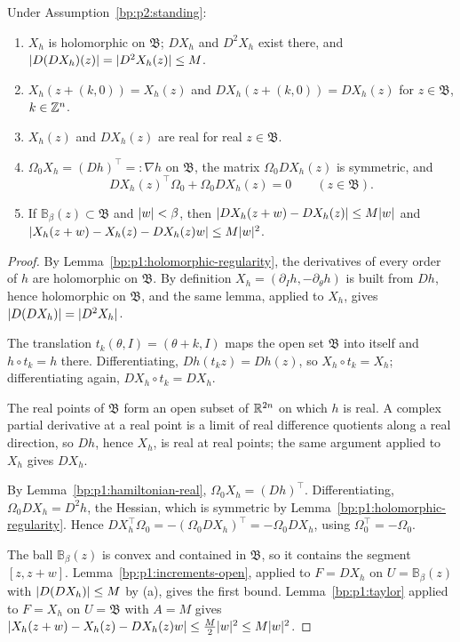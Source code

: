 \begin{lemma}\label{bp:p2:hamiltonian}
Under Assumption~\ref{bp:p2:standing}:
\begin{enumerate}[label=(\alph*)]
\item $X_h$ is holomorphic on $\mathfrak B$; $DX_h$ and $D^2X_h$ exist there, and
  $\lvert D(DX_h)(z)\rvert=\lvert D^2X_h(z)\rvert\le M$.
\item $X_h(z+(k,0))=X_h(z)$ and $DX_h(z+(k,0))=DX_h(z)$ for $z\in\mathfrak B$, $k\in\mathbb{Z}^n$.
\item $X_h(z)$ and $DX_h(z)$ are real for real $z\in\mathfrak B$.
\item $\Omega_0X_h=(Dh)^\top=:\nabla h$ on $\mathfrak B$, the matrix $\Omega_0DX_h(z)$ is symmetric, and
  \[
  DX_h(z)^\top\Omega_0+\Omega_0DX_h(z)=0\qquad(z\in\mathfrak B).
  \]
\item If $\mathbb B_\beta(z)\subset\mathfrak B$ and $\lvert w\rvert<\beta$, then
  $\lvert DX_h(z+w)-DX_h(z)\rvert\le M\lvert w\rvert$ and $\lvert X_h(z+w)-X_h(z)-DX_h(z)w\rvert\le M\lvert w\rvert^2$.
\end{enumerate}
\end{lemma}

\begin{proof}
\label{step:p2:ham-regular}
By Lemma~\ref{bp:p1:holomorphic-regularity}, the derivatives of every order of $h$ are holomorphic on
$\mathfrak B$. By definition $X_h=(\partial_Ih,-\partial_\theta h)$ is built from $Dh$, hence holomorphic on
$\mathfrak B$, and the same lemma, applied to $X_h$, gives $\lvert D(DX_h)\rvert=\lvert D^2X_h\rvert$.

\label{step:p2:ham-periodic}
The translation $t_k(\theta,I)=(\theta+k,I)$ maps the open set $\mathfrak B$ into itself and
$h\circ t_k=h$ there. Differentiating, $Dh(t_kz)=Dh(z)$, so $X_h\circ t_k=X_h$; differentiating again,
$DX_h\circ t_k=DX_h$.

\label{step:p2:ham-real}
The real points of $\mathfrak B$ form an open subset of $\mathbb{R}^{2n}$ on which $h$ is real. A complex
partial derivative at a real point is a limit of real difference quotients along a real direction, so
$Dh$, hence $X_h$, is real at real points; the same argument applied to $X_h$ gives $DX_h$.

\label{step:p2:ham-symplectic}
By Lemma~\ref{bp:p1:hamiltonian-real}, $\Omega_0X_h=(Dh)^\top$. Differentiating, $\Omega_0DX_h=D^2h$, the
Hessian, which is symmetric by Lemma~\ref{bp:p1:holomorphic-regularity}.
Hence $DX_h^\top\Omega_0=-(\Omega_0DX_h)^\top=-\Omega_0DX_h$, using $\Omega_0^\top=-\Omega_0$.

\label{step:p2:ham-mvt}
The ball $\mathbb B_\beta(z)$ is convex and contained in $\mathfrak B$, so it contains the segment
$[z,z+w]$. Lemma~\ref{bp:p1:increments-open}, applied to $F=DX_h$ on $U=\mathbb B_\beta(z)$ with
$\lvert D(DX_h)\rvert\le M$ by (a), gives the first bound. Lemma~\ref{bp:p1:taylor} applied to $F=X_h$ on $U=\mathfrak B$ with $A=M$ gives
$\lvert X_h(z+w)-X_h(z)-DX_h(z)w\rvert\le\frac M2\lvert w\rvert^2\le M\lvert w\rvert^2$.
\end{proof}

